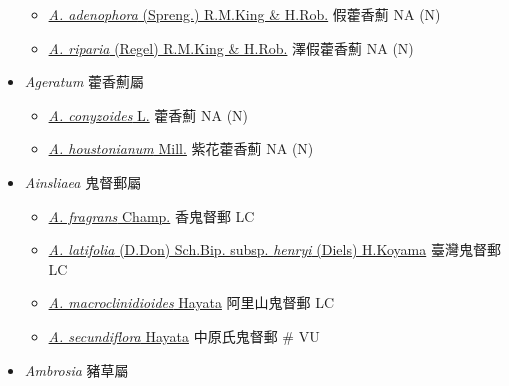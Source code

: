 \begin{itemize}
  \begin{itemize}
        \item[] \href{http://www.theplantlist.org/tpl1.1/search?q=Ageratina+adenophora}{\textit{A. adenophora} (Spreng.) R.M.King \& H.Rob.}   假藿香薊   NA (N)
        \item[] \href{http://www.theplantlist.org/tpl1.1/search?q=Ageratina+riparia}{\textit{A. riparia} (Regel) R.M.King \& H.Rob.}   澤假藿香薊   NA (N)
  \end{itemize}
 \item[] \textit{Ageratum} 藿香薊屬
                                
  \begin{itemize}
        \item[] \href{http://www.theplantlist.org/tpl1.1/search?q=Ageratum+conyzoides}{\textit{A. conyzoides} L.}   藿香薊   NA (N)
        \item[] \href{http://www.theplantlist.org/tpl1.1/search?q=Ageratum+houstonianum}{\textit{A. houstonianum} Mill.}   紫花藿香薊   NA (N)
  \end{itemize}
 \item[] \textit{Ainsliaea} 鬼督郵屬
                                
  \begin{itemize}
        \item[] \href{http://www.theplantlist.org/tpl1.1/search?q=Ainsliaea+fragrans}{\textit{A. fragrans} Champ.}   香鬼督郵   LC
        \item[] \href{http://www.theplantlist.org/tpl1.1/search?q=Ainsliaea+latifolia+subsp.+henryi}{\textit{A. latifolia} (D.Don) Sch.Bip. subsp. \textit{henryi} (Diels) H.Koyama}   臺灣鬼督郵   LC
        \item[] \href{http://www.theplantlist.org/tpl1.1/search?q=Ainsliaea+macroclinidioides}{\textit{A. macroclinidioides} Hayata}   阿里山鬼督郵   LC
        \item[] \href{http://www.theplantlist.org/tpl1.1/search?q=Ainsliaea+secundiflora}{\textit{A. secundiflora} Hayata}   中原氏鬼督郵  \# VU
  \end{itemize}
 \item[] \textit{Ambrosia} 豬草屬
                                

\end{itemize}
